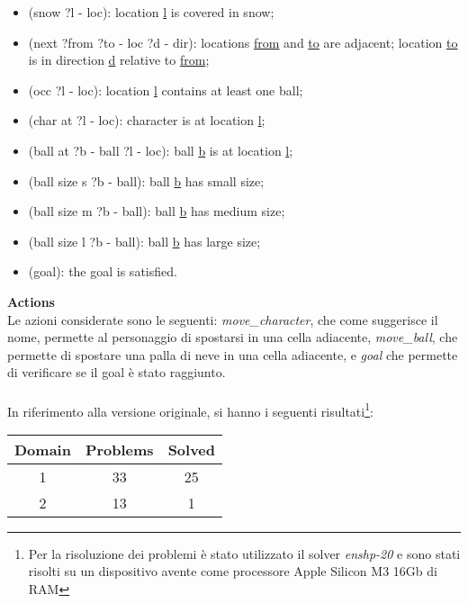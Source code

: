 \documentclass{article}
\begin{document}
\begin{itemize}
    \item (snow ?l - loc): location \underline{l} is covered in snow; \vspace{-0.15cm}
    \item (next ?from ?to - loc ?d - dir): locations
    \underline{from} and \underline{to} are adjacent; location \underline{to} is in
    direction \underline{d} relative to \underline{from};\vspace{-0.15cm}
    \item (occ ?l - loc): location \underline{l} contains at least one ball;\vspace{-0.15cm}
    \item (char at ?l - loc): character is at location \underline{l};\vspace{-0.15cm}
    \item (ball at ?b - ball ?l - loc): ball \underline{b} is at location \underline{l};\vspace{-0.15cm}
    \item (ball size s ?b - ball): ball \underline{b} has small size;\vspace{-0.15cm}
    \item (ball size m ?b - ball): ball \underline{b} has medium size;\vspace{-0.15cm}
    \item (ball size l ?b - ball): ball \underline{b} has large size;\vspace{-0.15cm}
    \item (goal): the goal is satisfied.
\end{itemize}
\vspace{0.5cm}
\noindent
\textbf{Actions}\\
Le azioni considerate sono le seguenti: \textit{move\_character}, che come suggerisce il nome, permette al personaggio di spostarsi in una cella adiacente,
\textit{move\_ball}, che permette di spostare una palla di neve in una cella adiacente, e \textit{goal} che permette di verificare se il goal è stato raggiunto.\\ \\
In riferimento alla versione originale, si hanno i seguenti risultati\footnote{Per la risoluzione dei problemi è stato utilizzato il solver \textit{enshp-20} e sono stati risolti su un dispositivo avente come processore Apple Silicon M3 16Gb di RAM}:
\begin{table}[H]
    \centering
    \begin{tabular}{|c|c|c|}
        \hline
        \textbf{Domain} & \textbf{Problems} & \textbf{Solved} \\
        \hline
        1 & 33 & 25 \\
        \hline
        2 & 13 & 1 \\
        \hline
    \end{tabular}
\end{table}
\end{document}
